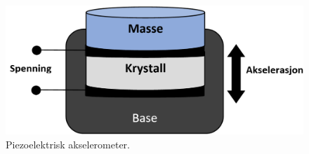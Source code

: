 \begin{figure}[htp]
\centering
\includegraphics[width=0.5\columnwidth]{figures/piezo-aks}
\caption{Piezoelektrisk akselerometer.}
\label{fig:piezo-aks}
\end{figure}